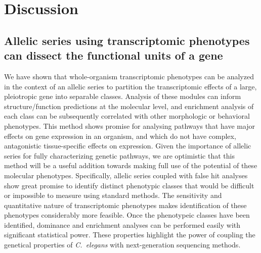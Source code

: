 \documentclass[10pt, twocolumn]{article}
\newcommand{\cel}{\emph{C.~elegans}}
\newcommand{\gene}[1]{\mbox{\emph{#1}}}
\newcommand{\dpy}{\gene{mdt-12}}
\begin{document}
%


\section*{Discussion}
\label{sec:conclusions}
\subsection*{Allelic series using transcriptomic phenotypes can dissect the
             functional units of a gene}
We have shown that whole-organism transcriptomic phenotypes can be analyzed in
the context of an allelic series to partition the transcriptomic effects of a
large, pleiotropic gene into separable classes. Analysis of these modules can
inform structure/function predictions at the molecular level, and enrichment
analysis of each class can be subsequently correlated with other morphologic or
behavioral phenotypes. This method shows promise for analysing pathways that
have major effects on gene expression in an organism, and which do not have
complex, antagonistic tissue-specific effects on expression. Given the
importance of allelic series for fully characterizing genetic pathways, we are
optimistic that this method will be a useful addition towards making full use of
the potential of these molecular phenotypes. Specifically, allelic series
coupled with false hit analyses show great promise to identify distinct
phenotypic classes that would be difficult or impossible to measure using
standard methods. The sensitivity and quantitative nature of transcriptomic
phenotypes makes identification of these phenotypes considerably more feasible.
Once the phenotypeic classes have been identified, dominance and enrichment
analyses can be performed easily with significant statistical power. These
properties highlight the power of coupling the genetical properties of \cel{}
with next-generation sequencing methods.
\end{document}

